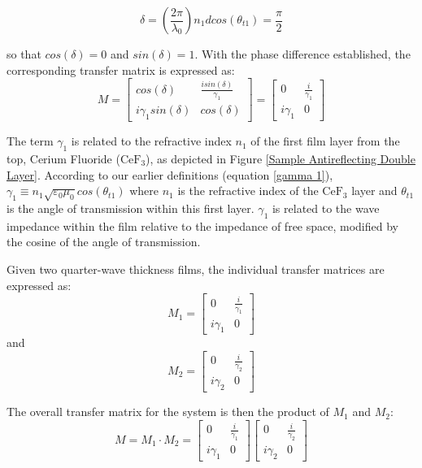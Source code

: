 \begin{equation}
    \delta = \left(\frac{2\pi}{\lambda_0}\right) n_1dcos(\theta_{t1}) = \frac{\pi}{2}
\end{equation}

so that $cos(\delta) = 0$ and $sin(\delta) = 1$. With the phase difference established, the corresponding transfer matrix is expressed as:
    \[
    M = 
            \begin{bmatrix}
            cos(\delta) & \frac{isin(\delta)}{\gamma_1} \\
            i\gamma_1sin(\delta) & cos(\delta)
            \end{bmatrix} = 
                \begin{bmatrix}
                0 & \frac{i}{\gamma_1}  \\
                i\gamma_1 & 0
              \end{bmatrix}
    \]

The term $\gamma_1$ is related to the refractive index $n_1$ of the first film layer from the top, Cerium Fluoride ($\text{CeF}_3$), as depicted in Figure \ref{Sample Antireflecting Double Layer}. According to our earlier definitions (equation \ref{gamma 1}), $\gamma_1 \equiv n_1 \sqrt{\varepsilon_0\mu_0} cos(\theta_{t1})$ where $n_1$ is the refractive index of the $\text{CeF}_3$ layer and $\theta_{t1}$ is the angle of transmission within this first layer. $\gamma_1$ is related to the wave impedance within the film relative to the impedance of free space, modified by the cosine of the angle of transmission.

Given two quarter-wave thickness films, the individual transfer matrices are expressed as:
\[
M_1 = 
    \begin{bmatrix}
        0 & \frac{i}{\gamma_1}  \\
        i\gamma_1 & 0
    \end{bmatrix}
\]
and
\[
M_2 = 
    \begin{bmatrix}
        0 & \frac{i}{\gamma_2}  \\
        i\gamma_2 & 0
    \end{bmatrix}
\]

The overall transfer matrix for the system is then the product of \(M_1\) and \(M_2\):
\[
M = M_1 \cdot M_2 = 
    \begin{bmatrix}
        0 & \frac{i}{\gamma_1}  \\
        i\gamma_1 & 0
    \end{bmatrix}
    \begin{bmatrix}
        0 & \frac{i}{\gamma_2}  \\
        i\gamma_2 & 0
    \end{bmatrix}
\]

